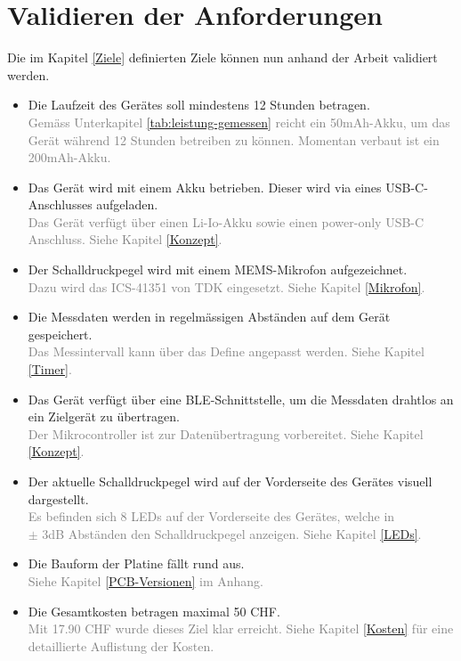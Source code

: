 \documentclass[12pt]{article}
\newcommand{\greencheck}{{\color{green}\checkmark}}
\begin{document}
	\section{Validieren der Anforderungen} \label{Validierung}
	Die im Kapitel \ref{Ziele} definierten Ziele können nun anhand der Arbeit validiert werden.
	\begin{itemize}
		\item [\greencheck] Die Laufzeit des Gerätes soll mindestens 12 Stunden betragen. \\
		\textcolor{gray}{Gemäss Unterkapitel \ref{tab:leistung-gemessen} reicht ein 50mAh-Akku, um das Gerät während 12 Stunden betreiben zu können. Momentan verbaut ist ein 200mAh-Akku.}
		\item [\greencheck] Das Gerät wird mit einem Akku betrieben. Dieser wird via eines USB-C-Anschlusses aufgeladen. \\
		\textcolor{gray}{Das Gerät verfügt über einen Li-Io-Akku sowie einen power-only USB-C Anschluss. Siehe Kapitel \ref{Konzept}.}
		\item [\greencheck] Der Schalldruckpegel wird mit einem MEMS-Mikrofon aufgezeichnet. \\
		\textcolor{gray}{Dazu wird das ICS-41351 von TDK eingesetzt. Siehe Kapitel \ref{Mikrofon}.}
		\item [\greencheck] Die Messdaten werden in regelmässigen Abständen auf dem Gerät gespeichert. \\
		\textcolor{gray}{Das Messintervall kann über das Define angepasst werden. Siehe Kapitel \ref{Timer}.}
		\item [\greencheck] Das Gerät verfügt über eine BLE-Schnittstelle, um die Messdaten drahtlos an ein Zielgerät zu übertragen.\\
		\textcolor{gray}{Der Mikrocontroller ist zur Datenübertragung vorbereitet. Siehe Kapitel \ref{Konzept}.}
		\item [\greencheck] Der aktuelle Schalldruckpegel wird auf der Vorderseite des Gerätes visuell dargestellt. \\
		\textcolor{gray}{Es befinden sich 8 LEDs auf der Vorderseite des Gerätes, welche in \\ $\pm$ 3dB Abständen den Schalldruckpegel anzeigen. Siehe Kapitel \ref{LEDs}.}
		\item [\greencheck] Die Bauform der Platine fällt rund aus. \\
		\textcolor{gray}{Siehe Kapitel \ref{PCB-Versionen} im Anhang.}
		\item [\greencheck] Die Gesamtkosten betragen maximal 50 CHF. \\
		\textcolor{gray}{Mit 17.90 CHF wurde dieses Ziel klar erreicht. Siehe Kapitel \ref{Kosten} für eine detaillierte Auflistung der Kosten.}
	\end{itemize}
	
\end{document}
